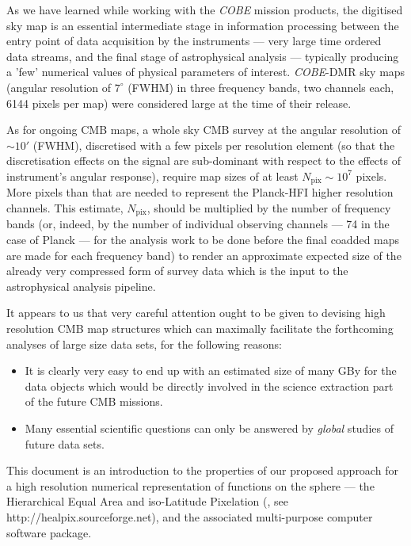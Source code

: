 \documentclass[12pt,twoside]{article}
\newcommand{\healpixwebpage}{http://healpix.sourceforge.net}
\newcommand{\npix}{N_{\mathrm{pix}}}
\begin{document}
As we have learned while working with the {\it COBE} mission products, 
the digitised
sky map is an essential intermediate 
stage in information processing between 
the entry point of data acquisition by the 
instruments --- very large time ordered data streams,
and the final stage of astrophysical analysis --- 
typically producing a 
'few'
 numerical values
of physical parameters of interest. 
{\it COBE}-DMR sky maps (angular resolution of $7^\circ$ (FWHM) in
three frequency bands, two channels each, 6144 pixels per map)
were considered large at the time of their release.

As for ongoing CMB maps, a whole sky CMB survey  
at the angular resolution
of $\sim 10'$ (FWHM), discretised with 
a few pixels per resolution element 
(so that the discretisation effects on the signal are  
sub-dominant with respect to the effects of instrument's angular response),
require map sizes of at least 
$\npix \sim  10^7$ pixels.
More pixels than that are needed to represent the Planck-HFI higher 
resolution channels.
This estimate, $\npix$, should be multiplied by  the number of frequency bands 
(or, indeed, by the number of individual
observing channels --- 74 in the case of Planck --- for the analysis work 
to be done before the
final coadded maps are made for each frequency band) to render 
an approximate expected
size of the already very compressed form of survey data which is
the input to the astrophysical analysis pipeline. 

It appears to us that very careful
attention ought to be given to devising  high resolution CMB map
structures which can maximally facilitate 
the forthcoming analyses of large size data sets, for the following
reasons:
\begin{itemize}
\item It is clearly very easy to end up with an estimated size of many GBy 
for the 
data objects which would be directly involved in the science extraction
part of the future CMB missions.
\item Many essential scientific questions
can only be answered by {\em global} studies of  future data sets.
\end{itemize}

This document is an introduction to the
properties of our proposed approach for a high resolution numerical
representation of  functions on the sphere
 --- the Hierarchical
Equal Area and iso-Latitude Pixelation  (\healpixns, see 
\htmladdnormallink{\texttt{\healpixwebpage}}
{\healpixwebpage}), 
and the associated multi-purpose computer 
software package. 
 
\end{document}
